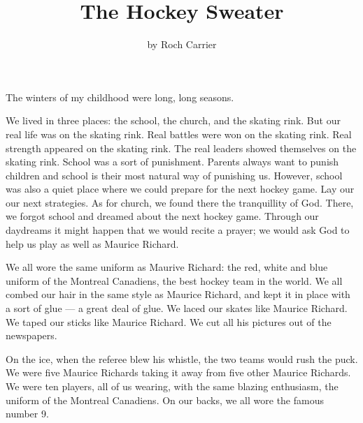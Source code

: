 \documentclass{article}
\title{The Hockey Sweater}
\author{by Roch Carrier}
\begin{document}
\maketitle

The winters of my childhood were long, long seasons.

We lived in three places: the school, the church, and the skating rink.
But our real life was on the skating rink. 
Real battles were won on the skating rink.
Real strength appeared on the skating rink.
The real leaders showed themselves on the skating rink.
School was a sort of punishment.
Parents always want to punish children and school is their most natural way of punishing us.
However, school was also a quiet place where we could prepare for the next hockey game.
Lay our our next strategies.
As for church, we found there the tranquillity of God.
There, we forgot school and dreamed about the next hockey game.
Through our daydreams it might happen that we would recite a prayer;
we would ask God to help us play as well as Maurice Richard.

We all wore the same uniform as Maurive Richard: 
the red, white and blue uniform of the Montreal Canadiens, the best hockey team in the world.
We all combed our hair in the same style as Maurice Richard, 
and kept it in place with a sort of glue --- a great deal of glue.
We laced our skates like Maurice Richard.
We taped our sticks like Maurice Richard.
We cut all his pictures out of the newspapers.

On the ice, when the referee blew his whistle, the two teams would rush the puck.
We were five Maurice Richards taking it away from five other Maurice Richards.
We were ten players, all of us wearing, with the same blazing enthusiasm, the uniform of the Montreal Canadiens.
On our backs, we all wore the famous number 9.
\end{document}
